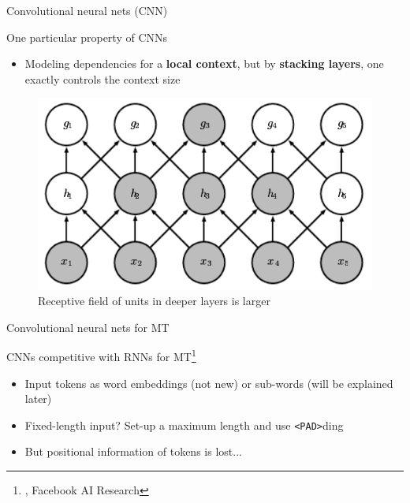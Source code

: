 \documentclass[12pt,aspectratio=169,handout]{beamer}
\begin{document}
\begin{frame}{Convolutional neural nets (CNN)}
	
	One particular property of CNNs
	
	\begin{itemize}
		\item Modeling dependencies for a \textbf{local context}, but by \textbf{stacking layers}, one exactly controls the context size
	\end{itemize}	
	
	
	\begin{figure}
		
		\includegraphics[width=0.5\linewidth]{img/dl-book-cnn.png}	
		\caption{Receptive field of units in deeper layers is larger}
	\end{figure}

	
\end{frame}


\begin{frame}{Convolutional neural nets for MT}
	
	CNNs competitive with RNNs for MT\footnote{\citet{Gehring.et.al.2017a.ICML}, Facebook AI Research}
	
	\begin{itemize}
		\item Input tokens as word embeddings (not new) or sub-words (will be explained later)
		\item Fixed-length input? Set-up a maximum length and use \texttt{<PAD>}ding
		\item But positional information of tokens is lost...
	\end{itemize}
	
\end{frame}
\end{document}
